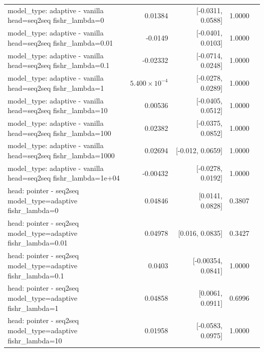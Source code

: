 \documentclass[10pt]{article}
\makeatletter
\newcommand{\stackcell}[1]{\begin{tabular}[t]{@{}l@{}}#1\end{tabular}}
\makeatother
\begin{document}
{\begin{longtable}{lrrrl}
\stackcell{model\_type: adaptive - vanilla\\\footnotesize head=seq2seq fishr\_lambda=0 } & 0.01384 & [-0.0311, 0.0588] & 1.0000 & \\
\stackcell{model\_type: adaptive - vanilla\\\footnotesize head=seq2seq fishr\_lambda=0.01 } & -0.0149 & [-0.0401, 0.0103] & 1.0000 & \\
\stackcell{model\_type: adaptive - vanilla\\\footnotesize head=seq2seq fishr\_lambda=0.1 } & -0.02332 & [-0.0714, 0.0248] & 1.0000 & \\
\stackcell{model\_type: adaptive - vanilla\\\footnotesize head=seq2seq fishr\_lambda=1 } & $5.400\times10^{-4}$ & [-0.0278, 0.0289] & 1.0000 & \\
\stackcell{model\_type: adaptive - vanilla\\\footnotesize head=seq2seq fishr\_lambda=10 } & 0.00536 & [-0.0405, 0.0512] & 1.0000 & \\
\stackcell{model\_type: adaptive - vanilla\\\footnotesize head=seq2seq fishr\_lambda=100 } & 0.02382 & [-0.0375, 0.0852] & 1.0000 & \\
\stackcell{model\_type: adaptive - vanilla\\\footnotesize head=seq2seq fishr\_lambda=1000 } & 0.02694 & [-0.012, 0.0659] & 1.0000 & \\
\stackcell{model\_type: adaptive - vanilla\\\footnotesize head=seq2seq fishr\_lambda=1e+04 } & -0.00432 & [-0.0278, 0.0192] & 1.0000 & \\
\stackcell{head: pointer - seq2seq\\\footnotesize model\_type=adaptive fishr\_lambda=0 } & 0.04846 & [0.0141, 0.0828] & 0.3807 & \\
\stackcell{head: pointer - seq2seq\\\footnotesize model\_type=adaptive fishr\_lambda=0.01 } & 0.04978 & [0.016, 0.0835] & 0.3427 & \\
\stackcell{head: pointer - seq2seq\\\footnotesize model\_type=adaptive fishr\_lambda=0.1 } & 0.0403 & [-0.00354, 0.0841] & 1.0000 & \\
\stackcell{head: pointer - seq2seq\\\footnotesize model\_type=adaptive fishr\_lambda=1 } & 0.04858 & [0.0061, 0.0911] & 0.6996 & \\
\stackcell{head: pointer - seq2seq\\\footnotesize model\_type=adaptive fishr\_lambda=10 } & 0.01958 & [-0.0583, 0.0975] & 1.0000 & \\

\end{longtable}}
\end{document}
